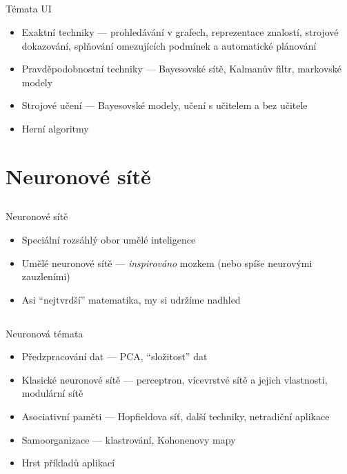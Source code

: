 \documentclass{beamer}
\begin{document}
\subsection{}
\begin{frame}{Témata UI}
\begin{itemize}
\item Exaktní techniky --- prohledávání v grafech, reprezentace znalostí, strojové dokazování, splňování omezujících podmínek a automatické plánování
\item Pravděpodobnostní techniky --- Bayesovské sítě, Kalmanův filtr, markovské modely
\item Strojové učení --- Bayesovské modely, učení s učitelem a bez učitele %
\item Herní algoritmy
\end{itemize}
\end{frame}

\section{Neuronové sítě}

\subsection{}
\begin{frame}{Neuronové sítě}
\begin{itemize}
\item Speciální rozsáhlý obor umělé inteligence
\item Umělé neuronové sítě --- {\em inspirováno} mozkem (nebo spíše neurovými zauzleními)
\item Asi ``nejtvrdší'' matematika, my si udržíme nadhled
\end{itemize}
\end{frame}

\subsection{}
\begin{frame}{Neuronová témata}
\begin{itemize}
\item Předzpracování dat --- PCA, ``složitost'' dat %
\item Klasické neuronové sítě --- perceptron, vícevrstvé sítě a jejich vlastnosti, modulární sítě
\item Asociativní paměti --- Hopfieldova síť, další techniky, netradiční aplikace
\item Samoorganizace --- klastrování, Kohonenovy mapy
\item Hrst příkladů aplikací
\end{itemize}
\end{frame}
\end{document}
